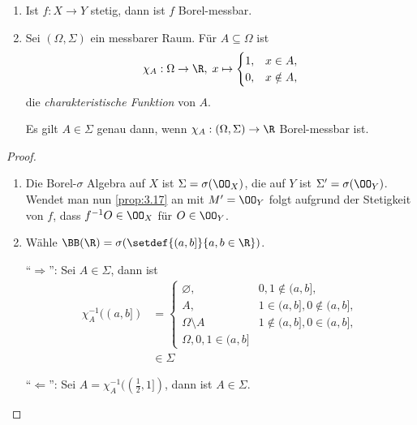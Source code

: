 \begin{cor}
\label{prop:3.18}
\begin{enumerate}[label=\arabic{*}.)]
  \item Ist $f: X\to Y$ stetig, dann ist $f$ Borel-messbar.
  \item Sei $(\Omega,\Sigma)$ ein messbarer Raum. Für $A\subseteq\Omega$ ist
  \begin{align*}
  \chi_A : \Omega\to\R,\;x\mapsto \begin{cases}
                                       1, & x\in A,\\
                                       0, & x\notin A,
                                       \end{cases}
  \end{align*}
die \emph{charakteristische Funktion } von $A$.

Es gilt $A\in\Sigma$ genau dann, wenn $\chi_A : (\Omega,\Sigma)\to\R$
Borel-messbar ist.\fishhere
\end{enumerate}
\end{cor}
\begin{proof}
\begin{enumerate}[label=\arabic{*}.)]
  \item Die Borel-$\sigma$ Algebra auf $X$ ist $\Sigma = \sigma(\OO_X)$, die
  auf $Y$ ist $\Sigma' = \sigma(\OO_Y)$. Wendet man nun \ref{prop:3.17} an mit
  $M' = \OO_Y$ folgt aufgrund der Stetigkeit von $f$, dass $f^{-1}{O}\in\OO_X$
  für $O\in\OO_Y$.
  \item Wähle $\BB(\R) = \sigma(\setdef{(a,b]}{a,b\in\R})$.
  
  ``$\Rightarrow$'': Sei $A\in\Sigma$, dann ist
  \begin{align*}
  \chi_A^{-1}((a,b]) &= \begin{cases}
                       \varnothing, & 0,1\notin(a,b],\\
                       A, & 1\in (a,b], 0\notin (a,b],\\
                       \Omega\setminus A & 1\notin(a,b], 0\in (a,b],\\
                       \Omega, 0,1\in(a,b]
                       \end{cases}\\ &\in \Sigma
  \end{align*}

``$\Leftarrow$'': Sei $A=\chi_A^{-1}((\frac{1}{2},1])$, dann ist $A\in\Sigma$.
\end{enumerate}
\end{proof}

